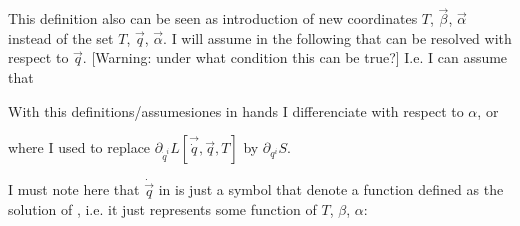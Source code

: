 \documentclass{article}
\begin{document}
This definition also can be seen as introduction of new coordinates 
$T$, $\vec{\beta}$, $\vec{\alpha}$ instead of the set 
$T$, $\vec{q}$, $\vec{\alpha}$. I will assume in the following that 
 can be resolved with respect to $\vec{q}$. 
[Warning: under what condition this can be true?] I.e. I can assume
that 

With this definitions/assumesiones in hands I differenciate 
with respect to $\alpha$,
or 

where I used  to replace 
$\partial_{\dot{q}^i}L[\vec{\dot{q}}, \vec{q}, T]$ by 
$\partial_{q^i}S$.

\par

I must note here that $\dot{\vec{q}}$ in  is just a symbol
that denote a function defined as the solution of 
, i.e. it just represents some function of $T$, $\beta$,
$\alpha$:
\end{document}
